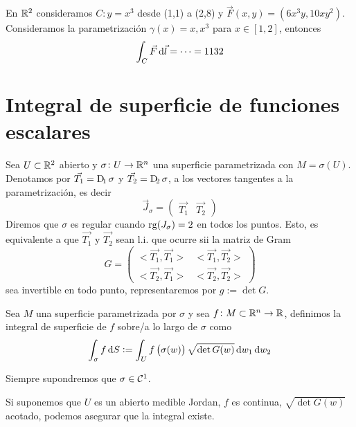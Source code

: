 \begin{example*}
    En $\mathbb{R}^2$ consideramos $C \colon y = x^3$ desde (1,1) a (2,8) y $\vec{F}(x, y) = \left( 6x^3y, 10xy^2 \right)$. Consideramos
    la parametrización $\gamma(x) = x,x^3$ para $x \in [1,2]$, entonces
    \[
        \int_C \vec{F} \dif \vec{l} = \cdots = 1132
    \]
\end{example*}

\section{Integral de superficie de funciones escalares}

\begin{defi}
    Sea $U \subset  \mathbb{R}^2$ abierto y $\sigma \colon U \to \mathbb{R}^n$ una superficie parametrizada con $M = \sigma(U)$. Denotamos por
    $\vec{T_1} = \Dif_1\sigma$ y $\vec{T_2} = \Dif_2 \sigma$, a los vectores tangentes a la parametrización, es decir
    \[
        \vec{J}_\sigma =
        \begin{pmatrix}
            \vec{T_1} & \vec{T_2}
        \end{pmatrix}
    \]
    Diremos que $\sigma$ es regular cuando $\operatorname{rg}(J_\sigma) = 2$ en todos los puntos. Esto, es equivalente a que $\vec{T_1}$ y $\vec{T_2}$ sean
    l.i. que ocurre sii la matriz de Gram
    \[
        G = 
        \begin{pmatrix}
            <\vec{T_1}, \vec{T_1}> & <\vec{T_1}, \vec{T_2}> \\
            <\vec{T_2}, \vec{T_1}> & <\vec{T_2}, \vec{T_2}>
        \end{pmatrix}
    \]
    sea invertible en todo punto, representaremos por $g := \det G$.
\end{defi}

\begin{defi}
    Sea $M$ una superficie parametrizada por $\sigma$ y sea $f \colon M \subset \mathbb{R}^n \to \mathbb{R}$, definimos la integral de superficie de $f$
    sobre/a lo largo de $\sigma$ como
    \[
        \int_\sigma f \dif S := \int_U f\left( \sigma(w) \right) \sqrt{\det G(w)} \dif w_1 \dif w_2
    \]
\end{defi}

\begin{obs*}
    Siempre supondremos que $\sigma \in \mathcal{C}^1$.
\end{obs*}

\begin{obs*}
    Si suponemos que $U$ es un abierto medible Jordan, $f$ es continua, $\sqrt{\det G(w)}$ acotado, podemos asegurar que la integral existe.
\end{obs*}

